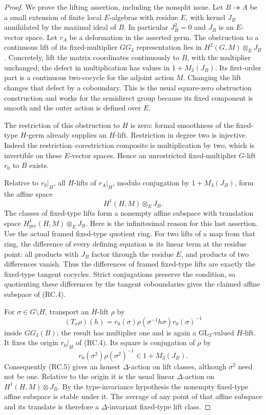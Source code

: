 \begin{proof}
We prove the lifting assertion, including the nonsplit issue.
Let \(B\twoheadrightarrow A\) be a small extension of finite
local \(E\)-algebras with residue \(E\), with kernel \(J_B\)
annihilated by the maximal ideal of \(B\).  In particular
\(J_B^2=0\) and \(J_B\) is an \(E\)-vector space.
Let \(r_A\) be a deformation in the asserted germ.
The obstruction to a continuous lift of its fixed-multiplier
\(GG_3\) representation lies in
\(H^2(G,M)\otimes_E J_B\).  Concretely, lift the matrix
coordinates continuously to \(B\), with the multiplier
unchanged; the defect in multiplication has values in
\(1+M_3(J_B)\).  Its first-order part is a continuous
two-cocycle for the adjoint action \(M\).  Changing the lift
changes that defect by a coboundary.  This is the usual
square-zero obstruction construction and works for the
semidirect group because its fixed component is smooth
and the outer action is defined over \(E\).

The restriction of this obstruction to \(H\) is zero:
formal smoothness of the fixed-type \(H\)-germ already
supplies an \(H\)-lift.  Restriction in degree two is
injective.  Indeed the restriction--corestriction composite
is multiplication by two, which is invertible on these
\(E\)-vector spaces.  Hence an unrestricted fixed-multiplier
\(G\)-lift \(r_0\) to \(B\) exists.

Relative to \(r_0|_H\), all \(H\)-lifts of \(r_A|_H\),
modulo conjugation by \(1+M_3(J_B)\), form the affine space
\[
                  H^1(H,M)\otimes_E J_B.
 \tag{RC.4}
\]
The classes of fixed-type lifts form a nonempty affine
subspace with translation space
\(H^1_{\mathrm{pcr}}(H,M)\otimes_E J_B\).
Here is the infinitesimal reason for this last assertion.
Use the actual framed fixed-type quotient ring.
For two lifts of a map from that ring, the difference
of every defining equation is its linear term at the
residue point: all products with \(J_B\) factor through
the residue \(E\), and products of two differences vanish.
Thus the differences of framed fixed-type lifts are exactly
the fixed-type tangent cocycles.  Strict conjugations
preserve the condition, so quotienting these differences
by the tangent coboundaries gives the claimed affine
subspace of (RC.4).

For \(\sigma\in G\setminus H\), transport an \(H\)-lift
\(\rho\) by
\[
 (T_\sigma\rho)(h)
  =r_0(\sigma)\rho(\sigma^{-1}h\sigma)r_0(\sigma)^{-1}
 \tag{RC.5}
\]
inside \(GG_3(B)\); the result has multiplier one and
is again a \(\mathrm{GL}_3\)-valued \(H\)-lift.
It fixes the origin \(r_0|_H\) of (RC.4).
Its square is conjugation of \(\rho\) by
\[
             r_0(\sigma^2)\rho(\sigma^2)^{-1}
                       \in1+M_3(J_B).
\]
Consequently (RC.5) gives an honest \(\Delta\)-action
on lift classes, although \(\sigma^2\) need not be one.
Relative to the origin it is the usual linear
\(\Delta\)-action on \(H^1(H,M)\otimes J_B\).
By the type-invariance hypothesis the nonempty fixed-type
affine subspace is stable under it.  The average of any
point of that affine subspace and its translate is
therefore a \(\Delta\)-invariant fixed-type lift class.


\end{proof}
